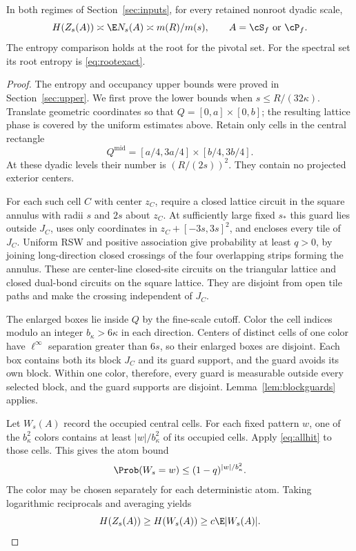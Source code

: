\begin{theorem}\label{thm:mesoscopic}
In both regimes of Section~\ref{sec:inputs}, for every retained nonroot dyadic scale,
\[
 H(Z_s(A))\asymp\E N_s(A)\asymp m(R)/m(s),
 \qquad A=\cS_f\text{ or }\cP_f.
\]
The entropy comparison holds at the root for the pivotal set. For the spectral set its root entropy is \eqref{eq:rootexact}.
\end{theorem}
\begin{proof}
The entropy and occupancy upper bounds were proved in Section~\ref{sec:upper}. We first prove the lower bounds when $s\le R/(32\kappa)$. Translate geometric coordinates so that $Q=[0,a]\times[0,b]$; the resulting lattice phase is covered by the uniform estimates above. Retain only cells in the central rectangle
\[
 Q^{\mathrm{mid}}=[a/4,3a/4]\times[b/4,3b/4].
\]
At these dyadic levels their number is $(R/(2s))^2$. They contain no projected exterior centers.

For each such cell $C$ with center $z_C$, require a closed lattice circuit in the square annulus with radii $s$ and $2s$ about $z_C$. At sufficiently large fixed $s_*$ this guard lies outside $J_C$, uses only coordinates in $z_C+[-3s,3s]^2$, and encloses every tile of $J_C$. Uniform RSW and positive association give probability at least $q>0$, by joining long-direction closed crossings of the four overlapping strips forming the annulus. These are center-line closed-site circuits on the triangular lattice and closed dual-bond circuits on the square lattice. They are disjoint from open tile paths and make the crossing independent of $J_C$.

The enlarged boxes lie inside $Q$ by the fine-scale cutoff. Color the cell indices modulo an integer $b_\kappa>6\kappa$ in each direction. Centers of distinct cells of one color have $\ell^\infty$ separation greater than $6s$, so their enlarged boxes are disjoint. Each box contains both its block $J_C$ and its guard support, and the guard avoids its own block. Within one color, therefore, every guard is measurable outside every selected block, and the guard supports are disjoint. Lemma~\ref{lem:blockguards} applies.

Let $W_s(A)$ record the occupied central cells. For each fixed pattern $w$, one of the $b_\kappa^2$ colors contains at least $|w|/b_\kappa^2$ of its occupied cells. Apply \eqref{eq:allhit} to those cells. This gives the atom bound
\[
 \Prob(W_s=w)\le(1-q)^{|w|/b_\kappa^2}.
\]
The color may be chosen separately for each deterministic atom. Taking logarithmic reciprocals and averaging yields
\begin{equation}\label{eq:entropybulk}
 H(Z_s(A))\ge H(W_s(A))\ge c\E|W_s(A)|.
\end{equation}


\end{proof}
